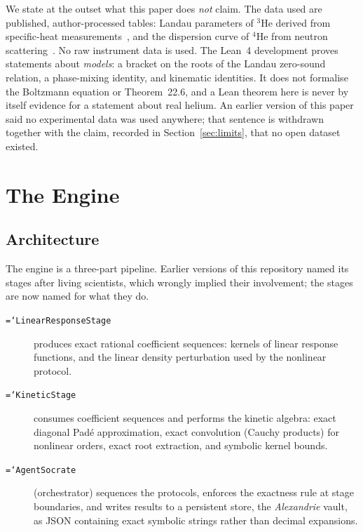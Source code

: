 \documentclass[11pt,a4paper]{article}
\newcommand{\code}[1]{\texttt{\hyphenchar\font=`\-\relax #1}}
\begin{document}
We state at the outset what this paper does \emph{not} claim. The data used are
published, author-processed tables: Landau parameters of $^3$He derived from
specific-heat measurements~\cite{kollar2000,greywall1983}, and the dispersion
curve of $^4$He from neutron scattering~\cite{godfrin2021}. No raw instrument
data is used. The Lean~4 development proves statements about \emph{models}: a
bracket on the roots of the Landau zero-sound relation, a phase-mixing identity,
and kinematic identities. It does not formalise the Boltzmann equation or
Theorem~22.6, and a Lean theorem here is never by itself evidence for a
statement about real helium. An earlier version of this paper said no
experimental data was used anywhere; that sentence is withdrawn together with
the claim, recorded in Section~\ref{sec:limits}, that no open dataset existed.

\section{The Engine}
\label{sec:engine}

\subsection{Architecture}

The engine is a three-part pipeline. Earlier versions of this repository named
its stages after living scientists, which wrongly implied their involvement;
the stages are now named for what they do.

\begin{description}
  \item[\code{LinearResponseStage}] produces exact rational coefficient
        sequences: kernels of linear response functions, and the linear density
        perturbation used by the nonlinear protocol.
  \item[\code{KineticStage}] consumes coefficient sequences and performs the
        kinetic algebra: exact diagonal Pad\'e approximation, exact convolution
        (Cauchy products) for nonlinear orders, exact root extraction, and
        symbolic kernel bounds.
  \item[\code{AgentSocrate}] (orchestrator) sequences the protocols, enforces
        the exactness rule at stage boundaries, and writes results to a
        persistent store, the \emph{Alexandrie} vault, as JSON containing exact
        symbolic strings rather than decimal expansions.
\end{description}
\end{document}
